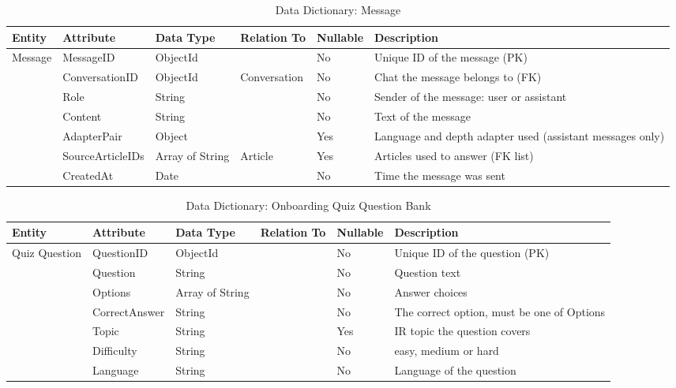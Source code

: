 \documentclass{FastFyp}
\begin{document}
\begin{table}[H]
\centering
\small
\setlength{\tabcolsep}{4pt}
\caption{Data Dictionary: Message}
\begin{tabular}{|p{2.0cm}|p{2.5cm}|p{1.7cm}|p{1.9cm}|p{1.3cm}|p{4.6cm}|}
\hline
\textbf{Entity} & \textbf{Attribute} & \textbf{Data Type} & \textbf{Relation To} & \textbf{Nullable} & \textbf{Description} \\ \hline
Message & MessageID & ObjectId & & No & Unique ID of the message (PK) \\ \cline{2-6}
 & ConversationID & ObjectId & Conversation & No & Chat the message belongs to (FK) \\ \cline{2-6}
 & Role & String & & No & Sender of the message: user or assistant \\ \cline{2-6}
 & Content & String & & No & Text of the message \\ \cline{2-6}
 & AdapterPair & Object & & Yes & Language and depth adapter used (assistant messages only) \\ \cline{2-6}
 & SourceArticleIDs & Array of String & Article & Yes & Articles used to answer (FK list) \\ \cline{2-6}
 & CreatedAt & Date & & No & Time the message was sent \\ \hline
\end{tabular}
\end{table}

\begin{table}[H]
\centering
\small
\setlength{\tabcolsep}{4pt}
\caption{Data Dictionary: Onboarding Quiz Question Bank}
\begin{tabular}{|p{2.0cm}|p{2.5cm}|p{1.7cm}|p{1.9cm}|p{1.3cm}|p{4.6cm}|}
\hline
\textbf{Entity} & \textbf{Attribute} & \textbf{Data Type} & \textbf{Relation To} & \textbf{Nullable} & \textbf{Description} \\ \hline
Quiz Question & QuestionID & ObjectId & & No & Unique ID of the question (PK) \\ \cline{2-6}
 & Question & String & & No & Question text \\ \cline{2-6}
 & Options & Array of String & & No & Answer choices \\ \cline{2-6}
 & CorrectAnswer & String & & No & The correct option, must be one of Options \\ \cline{2-6}
 & Topic & String & & Yes & IR topic the question covers \\ \cline{2-6}
 & Difficulty & String & & No & easy, medium or hard \\ \cline{2-6}
 & Language & String & & No & Language of the question \\ \hline
\end{tabular}
\end{table}
\end{document}
